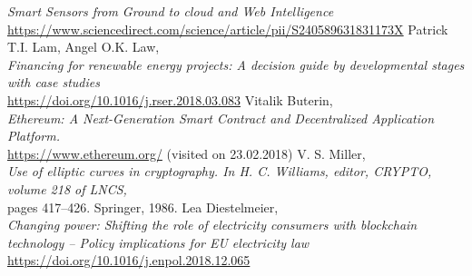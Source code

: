 \documentclass[11pt]{article}
\begin{document}
\begin{thebibliography}{25}
	\textit{Smart Sensors from Ground to cloud and Web Intelligence}\\
	\hyperref[https://www.sciencedirect.com/science/article/pii/S240589631831173X]{https://www.sciencedirect.com/science/article/pii/S240589631831173X}
	Patrick T.I. Lam, Angel O.K. Law, \\
	\textit{Financing for renewable energy projects: A decision guide by developmental stages with case studies}\\
	\hyperref[https://doi.org/10.1016/j.rser.2018.03.083]{https://doi.org/10.1016/j.rser.2018.03.083}
	Vitalik Buterin, \\
	\textit{Ethereum: A Next-Generation Smart
Contract and Decentralized Application Platform.}\\
	\hyperref[https://www.ethereum.org/]{https://www.ethereum.org/}  (visited on 23.02.2018)
	V. S. Miller, \\
	\textit{Use of elliptic curves in cryptography. In H. C. Williams, editor, CRYPTO, volume 218 of
LNCS,}\\
	  pages 417–426. Springer, 1986.
	Lea Diestelmeier, \\
	\textit{Changing power: Shifting the role of electricity consumers with blockchain technology – Policy implications for EU electricity law} \\
	\hyperref[https://doi.org/10.1016/j.enpol.2018.12.065]{https://doi.org/10.1016/j.enpol.2018.12.065}




\end{thebibliography}
\end{document}
